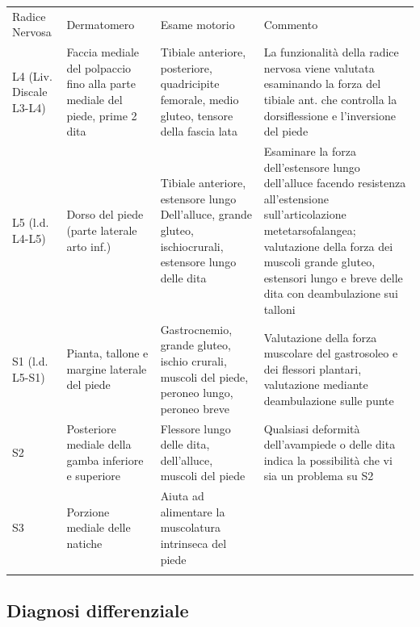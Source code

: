 \begin{table}
\begin{tabular}{p{}p{}p{}p{}}
\hline\noalign{\smallskip}
Radice Nervosa & Dermatomero & Esame motorio & Commento  \\
\noalign{\smallskip}\svhline\noalign{\smallskip}
L4
(Liv. Discale L3-L4)&
Faccia mediale del polpaccio fino alla parte mediale del piede, prime 2 dita
&
Tibiale anteriore, posteriore, quadricipite femorale, medio gluteo, tensore della fascia lata
&
La funzionalità della radice nervosa viene valutata esaminando la forza del tibiale ant. che controlla la dorsiflessione e  l’inversione del piede
\\
L5
(l.d. L4-L5)
&
Dorso del piede (parte laterale arto inf.)
&
Tibiale anteriore, estensore	lungo
Dell’alluce, grande gluteo, ischiocrurali, estensore lungo delle dita
&
Esaminare la forza dell’estensore lungo dell’alluce facendo resistenza all’estensione sull’articolazione metetarsofalangea; valutazione della forza dei muscoli grande gluteo, estensori lungo e breve delle dita con deambulazione sui talloni
\\
S1 (l.d. L5-S1)
&
Pianta, tallone e margine laterale del piede
&
Gastrocnemio, grande gluteo, ischio crurali, muscoli del piede, peroneo lungo, peroneo breve
&
Valutazione della forza muscolare del gastrosoleo e dei flessori plantari, valutazione mediante deambulazione sulle punte

\\
S2
&
Posteriore mediale della gamba inferiore e superiore
&
Flessore lungo delle dita, dell’alluce, muscoli del piede
&
Qualsiasi deformità dell’avampiede o delle dita indica la possibilità che vi sia un problema su S2
\\
S3
&
Porzione	mediale delle natiche
&
Aiuta ad alimentare la muscolatura intrinseca del piede
&  \\



\noalign{\smallskip}\hline\noalign{\smallskip}
\end{tabular}
\end{table}








\subsection{Diagnosi differenziale}


